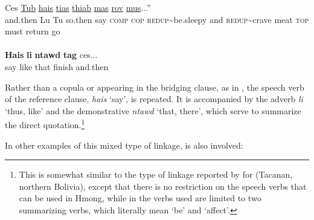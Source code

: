 \documentclass[output=paper]{LSP/langsci}
\begin{document}
\begin{exe}
\ex \label{Jaex:13ab}
\begin{xlist}
\ex \label{Jaex:13a}
\gll Ces \underline{} \underline{Tub} \underline{} \underline{hais} \underline{tias} \underline{}     \underline{} \underline{thiab} \underline{} \underline{} \underline{mas} \underline{} \underline{rov} \underline{mus}...'' \\
 and.then Lu Tu so.then say \textsc{comp} \textsc{cop} \textsc{redup}{\textasciitilde}be.sleepy and \textsc{redup}{\textasciitilde}crave  meat \textsc{top} must return go\\
\glt {}\\
\ex \label{Jaex:13b}
\gll \textbf{Hais} \textbf{li}  \textbf{ntawd} \textbf{tag} ces... \\     	      
     say like that  finish  and.then\\
\glt {} \citep[][8]{johnson92}
\end{xlist}
\end{exe}


\noindent
Rather than a copula or  appearing in the bridging clause, as in , the speech verb of the reference clause, \textit{hais} `say', is repeated. It is accompanied by the  adverb \textit{li} `thus, like' and the demonstrative \textit{ntawd} `that, there', which serve to summarize the direct quotation.\footnote{ This is somewhat similar to the type of linkage reported by \citet[][128--129]{Guillaume2011} for  (Tacanan, northern Bolivia), except that there is no restriction on the speech verbs that can be used in Hmong, while in  the verbs used are limited to two summarizing verbs, which literally mean `be' and `affect'.} 

In other examples of this mixed type of linkage,  is also involved:
\end{document}
